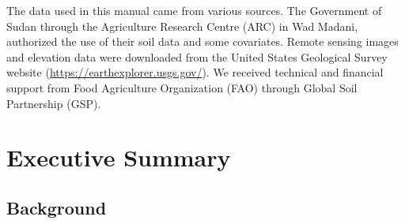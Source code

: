 \documentclass[
  10pt,
  b5paper,
]{book}
\begin{document}
The data used in this manual came from various sources. The Government of Sudan through the
Agriculture Research Centre (ARC) in Wad Madani, authorized the use of their soil data and some
covariates. Remote sensing images and elevation data were downloaded from the United States
Geological Survey website (\url{https://earthexplorer.usgs.gov/}). We received technical and financial support
from Food Agriculture Organization (FAO) through Global Soil Partnership (GSP).

\hypertarget{executive-summary}{%
\chapter*{Executive Summary}\label{executive-summary}}

\hypertarget{background}{%
\section*{Background}\label{background}}
\end{document}
